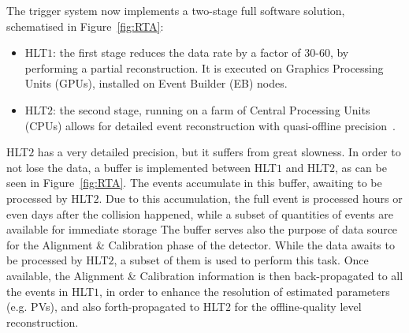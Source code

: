 The trigger system now implements a two-stage full software solution, schematised in Figure~\ref{fig:RTA}:
\begin{itemize}
\item HLT$1$: the first stage reduces the data rate by a factor of 30-60, by performing a partial reconstruction. It is executed on Graphics Processing Units (GPUs), installed on Event Builder (EB) nodes.
\item HLT$2$: the second stage, running on a farm of Central Processing Units (CPUs) allows for detailed event reconstruction with quasi-offline precision~\cite{Gazzoni:2670650}.
\end{itemize}
HLT$2$ has a very detailed precision, but it suffers from great slowness. In order to not lose the data, a buffer is implemented between HLT$1$ and HLT$2$, as can be seen in Figure~\ref{fig:RTA}. The events accumulate in this buffer, awaiting to be processed by HLT$2$. Due to this accumulation, the full event is processed hours or even days after the collision happened, while a subset of quantities of events are available for immediate storage 
The buffer serves also the purpose of data source for the Alignment \& Calibration phase of the detector. While the data awaits to be processed by HLT$2$, a subset of them is used to perform this task. Once available, the Alignment \& Calibration information is then back-propagated to all the events in HLT$1$, in order to enhance the resolution of estimated parameters (e.g. PVs), and also forth-propagated to HLT$2$ for the offline-quality level reconstruction.



